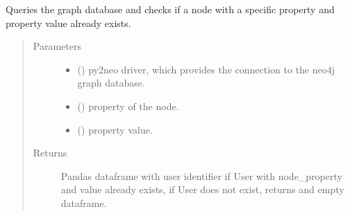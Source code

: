 \documentclass[letterpaper,10pt,english]{sphinxmanual}
\begin{document}
\begin{fulllineitems}
\label{\detokenize{_autosummary/graphdb_builder.users:graphdb_builder.users.users_controller.check_if_node_exists}}
Queries the graph database and checks if a node with a specific property and property value already exists.
\begin{quote}\begin{description}
\item[{Parameters}] \leavevmode\begin{itemize}
\item {} 
 () \textendash{} py2neo driver, which provides the connection to the neo4j graph database.

\item {} 
 () \textendash{} property of the node.

\item {} 
 (\sphinxstyleliteralemphasis{\sphinxupquote{, }}\sphinxstyleliteralemphasis{\sphinxupquote{, }}) \textendash{} property value.

\end{itemize}

\item[{Returns}] \leavevmode
Pandas dataframe with user identifier if User with node\_property and value already exists,             if User does not exist, returns and empty dataframe.

\end{description}\end{quote}

\end{fulllineitems}
\end{document}

